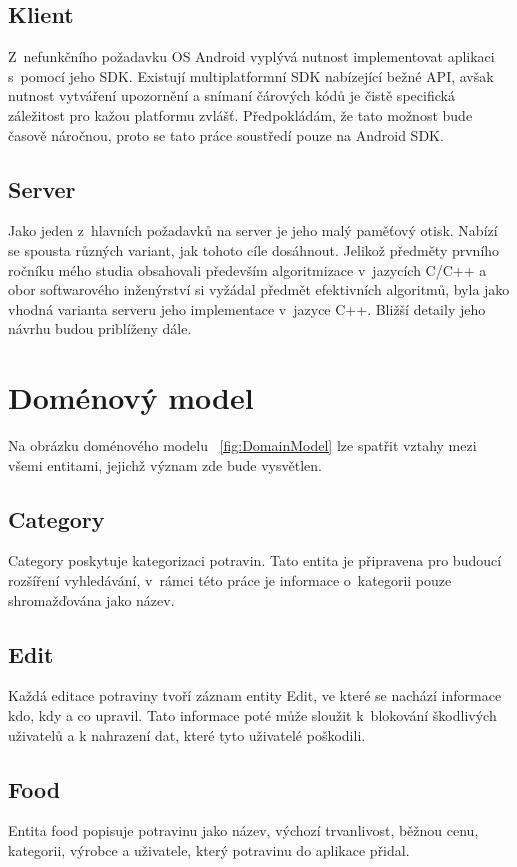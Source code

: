 \documentclass[thesis=B,czech]{FITthesis}[2013/10/20]
\begin{document}
\subsection{Klient}

Z~nefunkčního požadavku OS Android vyplývá nutnost implementovat aplikaci s~pomocí jeho SDK. Existují multiplatformní SDK nabízející bežné API, avšak nutnost vytváření upozornění a snímaní čárových kódů je čistě specifická záležitost pro kažou platformu zvlášť. Předpokládám, že tato možnost bude časově náročnou, proto se tato práce soustředí pouze na Android SDK.

\subsection{Server}

Jako jeden z~hlavních požadavků na server je jeho malý paměťový otisk. Nabízí se spousta různých variant, jak tohoto cíle dosáhnout. Jelikož předměty prvního ročníku mého studia obsahovali především algoritmizace v~jazycích C/C++ a obor softwarového inženýrství si vyžádal předmět efektivních algoritmů, byla jako vhodná varianta serveru jeho implementace v~jazyce C++. Bližší detaily jeho návrhu budou priblíženy dále.

\section{Doménový model}

Na obrázku doménového modelu ~\ref{fig:DomainModel} lze spatřit vztahy mezi všemi entitami, jejichž význam zde bude vysvětlen.

\subsection{Category}
Category poskytuje kategorizaci potravin. Tato entita je připravena pro budoucí rozšíření vyhledávání, v~rámci této práce je informace o~kategorii pouze shromažďována jako název.

\subsection{Edit}
Každá editace potraviny tvoří záznam entity Edit, ve které se nachází informace kdo, kdy a co upravil. Tato informace poté může sloužit k~blokování škodlivých uživatelů a k nahrazení dat, které tyto uživatelé poškodili.

\subsection{Food}
Entita food popisuje potravinu jako název, výchozí trvanlivost, běžnou cenu, kategorii, výrobce a uživatele, který potravinu do aplikace přidal.
\end{document}
